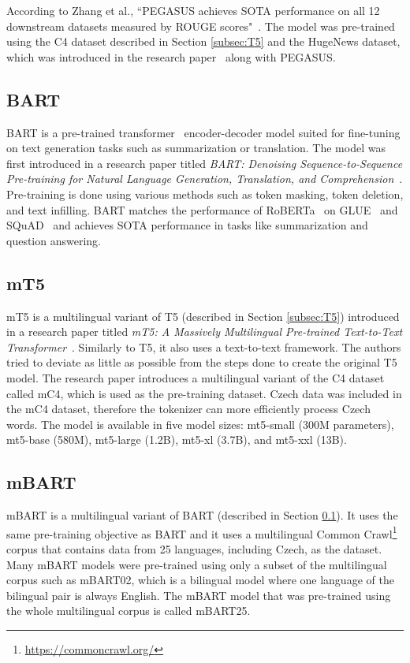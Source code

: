 \documentclass[english, ba, kiv, he, iso690numb, pdf, viewonly]{fasthesis}
\begin{document}
According to Zhang et al., “PEGASUS achieves SOTA performance on all 12 downstream datasets measured by ROUGE scores"~\cite{zhang2019pegasus}. The model was pre-trained using the C4 dataset described in Section \ref{subsec:T5} and the HugeNews dataset, which was introduced in the research paper~\cite{zhang2019pegasus} along with PEGASUS.
\subsection{BART} \label{subsec:BART}
BART is a pre-trained transformer~\cite{vaswani2023attention} encoder-decoder model suited for fine-tuning on text generation tasks such as summarization or translation. The model was first introduced in a research paper titled \textit{BART: Denoising Sequence-to-Sequence Pre-training for Natural Language Generation, Translation, and Comprehension}~\cite{lewis2019bart}. Pre-training is done using various methods such as token masking, token deletion, and text infilling. BART matches the performance of RoBERTa~\cite{liu2019roberta} on GLUE~\cite{wang-etal-2018-glue} and SQuAD~\cite{rajpurkar2016squad} and achieves SOTA performance in tasks like summarization and question answering.

\subsection{mT5}
mT5 is a multilingual variant of T5 (described in Section \ref{subsec:T5}) introduced in a research paper titled \textit{mT5: A Massively Multilingual Pre-trained Text-to-Text Transformer}~\cite{xue-etal-2021-mt5}. Similarly to T5, it also uses a text-to-text framework. The authors tried to deviate as little as possible from the steps done to create the original T5 model. The research paper introduces a multilingual variant of the C4 dataset called mC4, which is used as the pre-training dataset. Czech data was included in the mC4 dataset, therefore the tokenizer can more efficiently process Czech words.
The model is available in five model sizes: mt5-small (300M parameters), mt5-base (580M), mt5-large (1.2B), mt5-xl (3.7B), and mt5-xxl (13B).

\subsection{mBART}
mBART is a multilingual variant of BART (described in Section \ref{subsec:BART}). It uses the same pre-training objective as BART and it uses a multilingual Common Crawl\footnote{\url{https://commoncrawl.org/}} corpus that contains data from 25 languages, including Czech, as the dataset. Many mBART models were pre-trained using only a subset of the multilingual corpus such as mBART02, which is a bilingual model where one language of the bilingual pair is always English. The mBART model that was pre-trained using the whole multilingual corpus is called mBART25.
\end{document}
